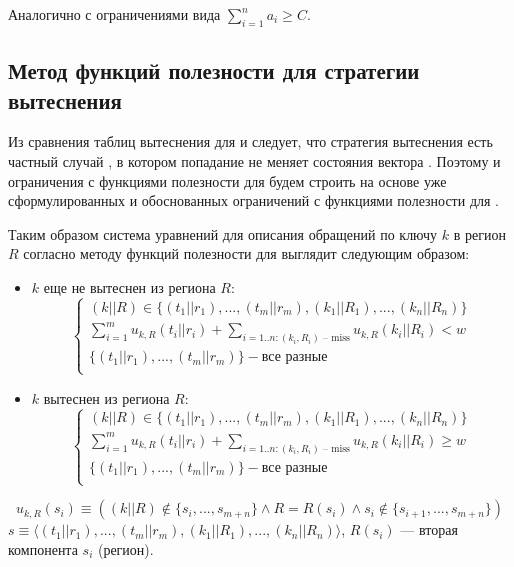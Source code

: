 Аналогично с ограничениями вида $\sum_{i=1}^n a_i \geqslant C$.


\subsection{Метод функций полезности для стратегии
вытеснения \FIFO}

Из сравнения таблиц вытеснения для \FIFO и \LRU следует, что
стратегия вытеснения \FIFO есть частный случай
\LRU, в котором попадание не меняет состояния вектора \LRU.
Поэтому и ограничения с функциями полезности для \FIFO будем строить
на основе уже сформулированных и обоснованных ограничений с
функциями полезности для \LRU. %

Таким образом система уравнений для описания обращений по ключу $k$ в регион $R$
согласно методу функций полезности для \FIFO выглядит следующим образом:
\begin{itemize}
\item $k$ еще не вытеснен из региона $R$:
$$
\left\{\begin{array}{l} (k||R) \in \{(t_1||r_1), ..., (t_m||r_m), (k_1||R_1),
..., (k_n||R_n)\}\\
\sum\limits_{i=1}^m u_{k,R}(t_i||r_i) + \sum\limits_{i=1..n:(k_i,R_i)\mbox{~--
miss}} u_{k,R}(k_i||R_i) < w\\
\{(t_1||r_1), ..., (t_m||r_m)\} - \mbox{все разные}\\
\end{array} \right.
$$
\item $k$ вытеснен из региона $R$:
$$
\left\{\begin{array}{l} (k||R) \in \{(t_1||r_1), ..., (t_m||r_m), (k_1||R_1),
..., (k_n||R_n)\}\\
\sum\limits_{i=1}^m u_{k,R}(t_i||r_i) + \sum\limits_{i=1..n:(k_i,R_i)\mbox{~--
miss}} u_{k,R}(k_i||R_i)
\geqslant w\\
\{(t_1||r_1), ..., (t_m||r_m)\} - \mbox{все разные}\\
\end{array} \right.
$$
\end{itemize}

$$u_{k,R}(s_i) \equiv ((k||R) \notin \{s_i, ..., s_{m+n}\} \wedge
R = R(s_i) \wedge s_i \notin\{s_{i+1},..., s_{m+n}\})$$
$s \equiv \langle (t_1||r_1), ..., (t_m||r_m), (k_1||R_1), ...,
(k_n||R_n)\rangle$, $R(s_i)$ --- вторая компонента $s_i$ (регион).


